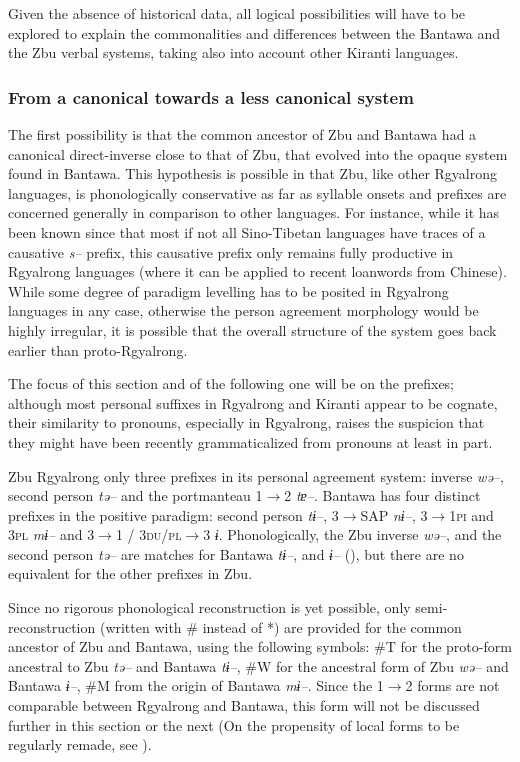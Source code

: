 \documentclass[twoside,a4paper,11pt]{article}
\newcommand{\ipa}[1]{{\phon\textit{#1}}}
\newcommand{\Σ}{\greek{Σ}}
\begin{document}
Given the absence of historical data, all logical possibilities will have to be explored to explain the commonalities and differences between the Bantawa and the Zbu verbal systems, taking also into account other Kiranti languages.




\subsubsection{From a canonical towards a less canonical system}

The first possibility is that the common ancestor of Zbu and Bantawa had a canonical direct-inverse close to that of Zbu, that evolved into the opaque system found in Bantawa. This hypothesis is possible in that Zbu, like other Rgyalrong languages, is   phonologically conservative as far as syllable onsets and prefixes are concerned generally in comparison to other languages. For instance, while it has been known since \citet{conrady1896} that most if not all Sino-Tibetan languages have  traces of a causative \ipa{s--} prefix, this causative prefix only remains fully productive in Rgyalrong languages (where it can be applied to recent loanwords from Chinese). While some degree of paradigm levelling has to be posited in Rgyalrong languages in any case, otherwise the person agreement morphology would be highly irregular, it is possible that the overall structure of the system goes back earlier than proto-Rgyalrong.

The focus of this section and of the following one will be on the prefixes; although most personal suffixes in Rgyalrong and Kiranti appear to be cognate, their similarity to pronouns, especially in Rgyalrong, raises the suspicion that they might have been recently grammaticalized from pronouns at least in part.   

Zbu Rgyalrong only three prefixes in its personal agreement system:   inverse   \ipa{wə--},   second person   \ipa{tə--}  and the portmanteau 1$\rightarrow$2   \ipa{tɐ--}. Bantawa has four distinct prefixes in the positive paradigm:   second person \ipa{tɨ--},   3$\rightarrow$SAP \ipa{nɨ--}, 3$\rightarrow$\textsc{1pi} and \textsc{3pl} \ipa{mɨ--} and 3$\rightarrow$1 / \textsc{3du/pl}$\rightarrow$3 \ipa{ɨ}. Phonologically,  the Zbu inverse  \ipa{wə--}, and the  second person   \ipa{tə--}  are matches for Bantawa \ipa{tɨ--},  and \ipa{ɨ--} (\citealt{jacques12agreement}), but there are no equivalent for the other prefixes in Zbu.


Since no rigorous phonological reconstruction is yet possible, only semi-reconstruction (written with \# instead of *) are provided for the common ancestor of Zbu and Bantawa, using the following symbols: \#T for the proto-form ancestral to Zbu \ipa{tə--} and Bantawa \ipa{tɨ--}, \#W for the ancestral form of Zbu \ipa{wə--} and Bantawa \ipa{ɨ--}, \#M   from the origin  of Bantawa \ipa{mɨ--}. Since the 1$\rightarrow$2 forms are not comparable between Rgyalrong and Bantawa, this form will not be discussed further in this section or the next (On the propensity of local forms to be regularly remade, see \citealt{heath98skewing}).
\end{document}
